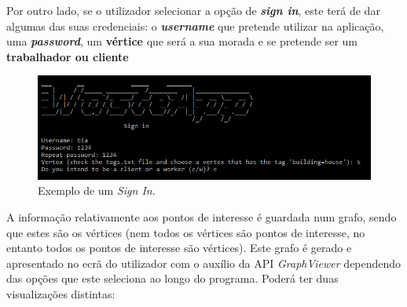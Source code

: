 \documentclass[article, a4paper, 12pt, oneside]{memoir}
\begin{document}
Por outro lado, se o utilizador selecionar a opção de \textit{\textbf{sign in}}, este terá de dar algumas das suas credenciais: o \textbf{\textit{username}} que pretende utilizar na aplicação, uma \textbf{\textit{password}}, um \textbf{vértice} que será a sua morada e se pretende ser um \textbf{trabalhador ou cliente}

\begin{figure}[h!]
  \centerline{\includegraphics[scale=0.8]{wasteapp_signin.png}}
  \caption{Exemplo de um \textit{Sign In}.}
\end{figure}

A informação relativamente aos pontos de interesse é guardada num grafo, sendo que estes são os vértices (nem todos os vértices são pontos de interesse, no entanto todos os pontos de interesse são vértices). Este grafo é gerado e apresentado no ecrã do utilizador com o auxílio da API \textit{GraphViewer} dependendo das opções que este seleciona ao longo do programa. Poderá ter duas visualizações distintas:
\end{document}
